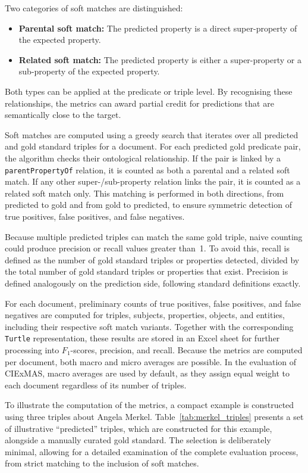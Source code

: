\documentclass[a4paper,oneside,bibliography=totoc]{scrbook}
\begin{document}
Two categories of soft matches are distinguished:
\begin{itemize}
  \item \textbf{Parental soft match:} The predicted property is a direct super-property of the expected property.
  \item \textbf{Related soft match:} The predicted property is either a super-property or a sub-property of the expected property.
\end{itemize}
Both types can be applied at the predicate or triple level. By recognising these relationships, the metrics can award partial credit for predictions that are semantically close to the target.

Soft matches are computed using a greedy search that iterates over all predicted and gold standard triples for a document. For each predicted gold predicate pair, the algorithm checks their ontological relationship. If the pair is linked by a \texttt{parentPropertyOf} relation, it is counted as both a parental and a related soft match. If any other super-/sub-property relation links the pair, it is counted as a related soft match only. This matching is performed in both directions, from predicted to gold and from gold to predicted, to ensure symmetric detection of true positives, false positives, and false negatives.

Because multiple predicted triples can match the same gold triple, naive counting could produce precision or recall values greater than~1. To avoid this, recall is defined as the number of gold standard triples or properties detected, divided by the total number of gold standard triples or properties that exist. Precision is defined analogously on the prediction side, following standard definitions exactly.

For each document, preliminary counts of true positives, false positives, and false negatives are computed for triples, subjects, properties, objects, and entities, including their respective soft match variants. Together with the corresponding \texttt{Turtle} representation, these results are stored in an Excel sheet for further processing into $F_1$-scores, precision, and recall. Because the metrics are computed per document, both macro and micro averages are possible. In the evaluation of CIExMAS, macro averages are used by default, as they assign equal weight to each document regardless of its number of triples.

To illustrate the computation of the metrics, a compact example is constructed using three triples about Angela Merkel. Table~\ref{tab:merkel_triples} presents a set of illustrative \enquote{predicted} triples, which are constructed for this example, alongside a manually curated gold standard. The selection is deliberately minimal, allowing for a detailed examination of the complete evaluation process, from strict matching to the inclusion of soft matches.
\end{document}
